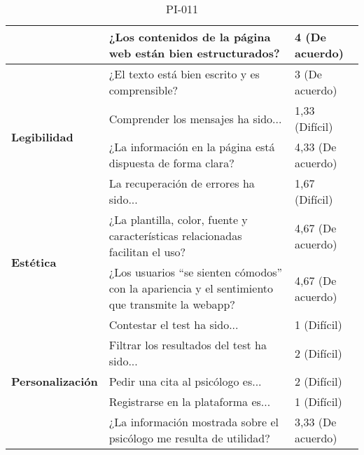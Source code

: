 \begin{table}[htpb]
\begin{tabularx}{\textwidth}{|l|X|l|}
                                          & ¿Los contenidos de la página web están bien estructurados?                                                          & 4 (De acuerdo)      \\ \hline
\multirow{4}{*}{\textbf{Legibilidad}}     & ¿El texto está bien escrito y es comprensible?                                                                      & 3 (De acuerdo)      \\ \cline{2-3} 
                                          & Comprender los mensajes ha sido...                                                                                  & 1,33 (Difícil)      \\ \cline{2-3} 
                                          & ¿La información en la página está dispuesta de forma clara?                                                         & 4,33 (De acuerdo)   \\ \cline{2-3} 
                                          & La recuperación de errores ha sido...                                                                               & 1,67 (Difícil)      \\ \hline
\multirow{2}{*}{\textbf{Estética}}        & ¿La plantilla, color, fuente y características relacionadas facilitan el uso?                                       & 4,67 (De acuerdo)   \\ \cline{2-3} 
                                          & ¿Los usuarios “se sienten cómodos” con la apariencia y el sentimiento que transmite la webapp?                      & 4,67 (De acuerdo)   \\ \hline
\multirow{5}{*}{\textbf{Personalización}} & Contestar el test ha sido...                                                                                        & 1 (Difícil)         \\ \cline{2-3} 
                                          & Filtrar los resultados del test ha sido...                                                                          & 2 (Difícil)         \\ \cline{2-3} 
                                          & Pedir una cita al psicólogo es...                                                                                   & 2 (Difícil)         \\ \cline{2-3} 
                                          & Registrarse en la plataforma es...                                                                                  & 1 (Difícil)         \\ \cline{2-3} 
                                          & ¿La información mostrada sobre el psicólogo me resulta de utilidad?                                                 & 3,33 (De acuerdo)   \\ \hline
\end{tabularx}
\caption{PI-011}
\end{table}


